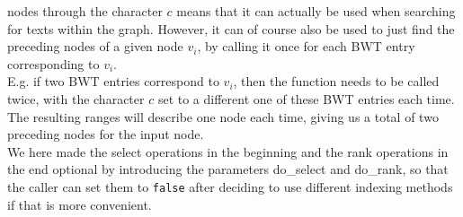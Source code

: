 \documentclass[a4paper,12pt,twoside,BCOR=10mm]{scrbook}
\begin{document}
nodes through the character $ c $ means that it can actually be used when searching
for texts within the graph.
However, it can of course also be used to just find the preceding nodes of a given node $ v_i $,
by calling it once for each BWT entry corresponding to $ v_i $. \\
E.g. if two BWT entries correspond to $ v_i $, then the function needs to be called twice,
with the character $ c $ set to a different one of these BWT entries each time.
The resulting ranges will describe one node each time,
giving us a total of two preceding nodes for the input node. \\
We here made the select operations in the beginning and the rank operations in
the end optional by introducing the parameters do\_select and do\_rank,
so that the caller can set them to \texttt{false} after
deciding to use different indexing methods if that is more convenient.
\end{document}

